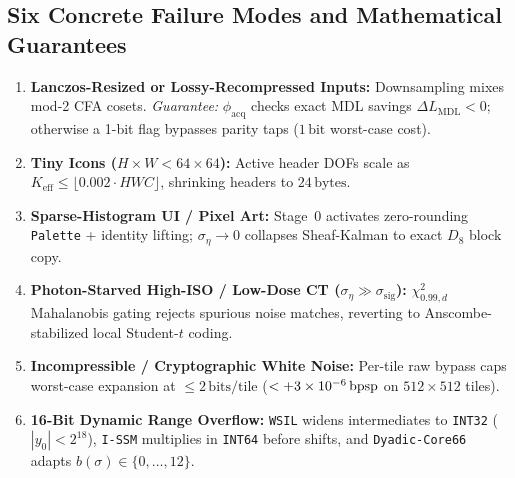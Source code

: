 \subsection{Six Concrete Failure Modes and Mathematical Guarantees}
\begin{enumerate}
  \item \textbf{Lanczos-Resized or Lossy-Recompressed Inputs:} Downsampling mixes mod-2 CFA cosets. \emph{Guarantee:} $\phi_{\mathrm{acq}}$ checks exact MDL savings $\Delta L_{\mathrm{MDL}} < 0$; otherwise a 1-bit flag bypasses parity taps ($1\,\mathrm{bit}$ worst-case cost).
  \item \textbf{Tiny Icons ($H\times W < 64\times 64$):} Active header DOFs scale as $K_{\mathrm{eff}} \le \lfloor 0.002\cdot HWC\rfloor$, shrinking headers to $24\,\mathrm{bytes}$.
  \item \textbf{Sparse-Histogram UI / Pixel Art:} Stage~0 activates zero-rounding \texttt{Palette} + identity lifting; $\sigma_\eta \to 0$ collapses Sheaf-Kalman to exact $D_8$ block copy.
  \item \textbf{Photon-Starved High-ISO / Low-Dose CT ($\sigma_\eta \gg \sigma_{\mathrm{sig}}$):} $\chi^2_{0.99,d}$ Mahalanobis gating rejects spurious noise matches, reverting to Anscombe-stabilized local Student-$t$ coding.
  \item \textbf{Incompressible / Cryptographic White Noise:} Per-tile raw bypass caps worst-case expansion at $\le 2\,\mathrm{bits/tile}$ ($< +3\times 10^{-6}\,\mathrm{bpsp}$ on $512\times 512$ tiles).
  \item \textbf{16-Bit Dynamic Range Overflow:} \texttt{WSIL} widens intermediates to \texttt{INT32} ($|y_0|<2^{18}$), \texttt{I-SSM} multiplies in \texttt{INT64} before shifts, and \texttt{Dyadic-Core66} adapts $b(\sigma) \in \{0,\dots,12\}$.
\end{enumerate}

